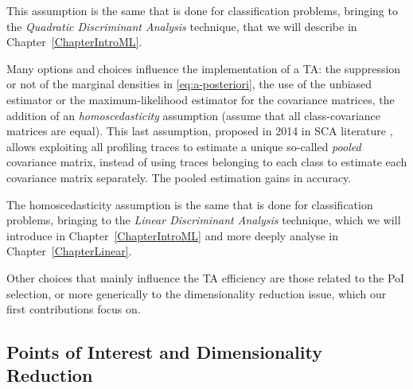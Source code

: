 \begin{remark}This assumption is the same that is done for classification problems, bringing to the \emph{Quadratic Discriminant Analysis} technique, that we will describe in Chapter~\ref{ChapterIntroML}. 
\end{remark}

Many options and choices influence the implementation of a TA: the suppression or not of the marginal densities in \eqref{eq:a-posteriori}, the use of the unbiased estimator or the maximum-likelihood estimator for the covariance matrices, the addition of an \emph{homoscedasticity} assumption (assume that all class-covariance matrices are equal). This last assumption, proposed in 2014 in SCA literature \cite{choudary2014efficient},  allows exploiting all profiling traces to estimate a unique so-called \emph{pooled} covariance matrix, instead of using traces belonging to each class to estimate each covariance matrix separately. The pooled estimation gains in accuracy. 

\begin{remark}
The homoscedasticity assumption is the same that is done for classification problems, bringing to the \emph{Linear Discriminant Analysis} technique, which we will introduce in Chapter~\ref{ChapterIntroML} and more deeply analyse in Chapter~\ref{ChapterLinear}.  
\end{remark}

Other choices that mainly influence the TA efficiency are those related to the PoI selection, or more generically to the dimensionality reduction issue, which our first contributions focus on.

\subsection{Points of Interest and Dimensionality Reduction}\label{sec:extractors}

